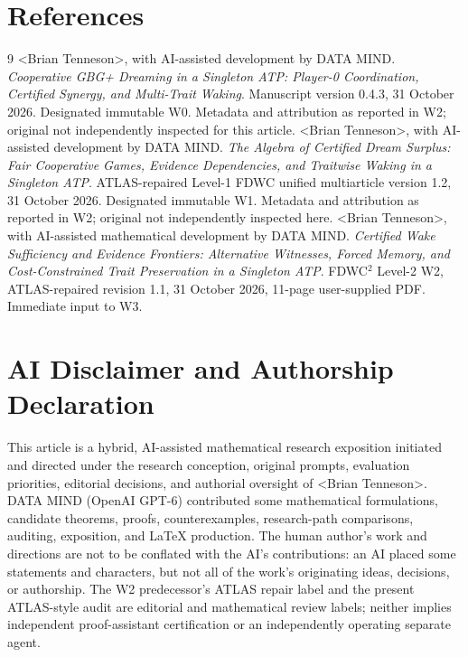 \documentclass[11pt,letterpaper]{article}
\newcommand{\authorname}{\textless{}Brian Tenneson\textgreater{}}
\begin{document}
\section*{References}
\begingroup\small\raggedright
\begin{thebibliography}{9}\setlength{\itemsep}{2pt}
\authorname, with AI-assisted development by DATA MIND.
\emph{Cooperative GBG+ Dreaming in a Singleton ATP: Player-0 Coordination, Certified Synergy, and Multi-Trait Waking}. Manuscript version 0.4.3, 31 October 2026. Designated immutable W0. Metadata and attribution as reported in W2; original not independently inspected for this article.
\authorname, with AI-assisted development by DATA MIND.
\emph{The Algebra of Certified Dream Surplus: Fair Cooperative Games, Evidence Dependencies, and Traitwise Waking in a Singleton ATP}. ATLAS-repaired Level-1 FDWC unified multiarticle version 1.2, 31 October 2026. Designated immutable W1. Metadata and attribution as reported in W2; original not independently inspected here.
\authorname, with AI-assisted mathematical development by DATA MIND.
\emph{Certified Wake Sufficiency and Evidence Frontiers: Alternative Witnesses, Forced Memory, and Cost-Constrained Trait Preservation in a Singleton ATP}. FDWC$^2$ Level-2 W2, ATLAS-repaired revision 1.1, 31 October 2026, 11-page user-supplied PDF. Immediate input to W3.
\end{thebibliography}
\endgroup

\clearpage
\section*{AI Disclaimer and Authorship Declaration}
\noindent This article is a hybrid, AI-assisted mathematical research exposition initiated and directed under the research conception, original prompts, evaluation priorities, editorial decisions, and authorial oversight of \authorname. DATA MIND (OpenAI GPT-6) contributed some mathematical formulations, candidate theorems, proofs, counterexamples, research-path comparisons, auditing, exposition, and LaTeX production. The human author's work and directions are not to be conflated with the AI's contributions: an AI placed some statements and characters, but not all of the work's originating ideas, decisions, or authorship. The W2 predecessor's ATLAS repair label and the present ATLAS-style audit are editorial and mathematical review labels; neither implies independent proof-assistant certification or an independently operating separate agent.
\end{document}
